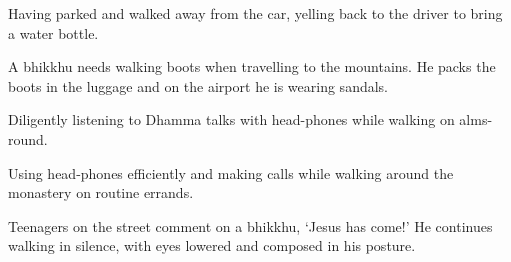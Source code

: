 \begin{exam}{\autoExamName}
\begin{problem*}
\begin{parts}
    \bigskip

    \item {} Having parked and walked away from the car, yelling back to the driver to bring a water bottle.

    \bigskip

    \item {} A bhikkhu needs walking boots when travelling to the mountains.
    He packs the boots in the luggage and on the airport he is wearing sandals.

    \bigskip

    \item {} Diligently listening to Dhamma talks with head-phones while
    walking on alms-round.

    \bigskip

    \item {} Using head-phones efficiently and making calls while walking
    around the monastery on routine errands.

    \bigskip

    \item {} Teenagers on the street comment on a bhikkhu, `Jesus has come!'
    He continues walking in silence, with eyes lowered and composed in his
    posture.

    \end{parts}

  \end{problem*}

\end{exam}
